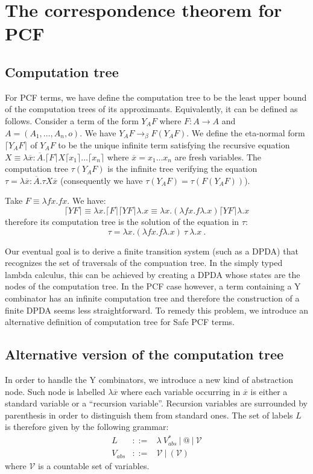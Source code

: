 \documentclass{article}
\newcommand{\aux}[1]{\lceil #1\rceil}
\newcommand{\betared}{\rightarrow_\beta}
\newcommand{\syneq}{\equiv}
\begin{document}
\section{The correspondence theorem for PCF}

\subsection{Computation tree}
For PCF terms, we have define the computation tree to be the least upper bound of the computation trees of its approximants. Equivalently, it can be defined as follows. Consider a term of the form $Y_A F$ where $F:A\rightarrow A$ and $A = (A_1,\ldots,A_n,o)$.
We have $Y_A F \betared F (Y_A F)$.
We define the eta-normal form $\aux{Y_A F}$ of $Y_A F$ to be the unique infinite term satisfying the recursive equation $X \syneq \lambda \overline{x}: \overline{A} . \aux{F} X \aux{x_1} \ldots \aux{x_n} $
where $\overline{x} = x_1 \ldots x_n$ are fresh variables.
The computation tree $\tau(Y_A F)$ is the infinite tree verifying the equation 
$\tau =  \lambda \overline{x}: \overline{A} . \tau X \overline{x}$ (consequently we have $\tau(Y_A F) = \tau(F (Y_A F))$).

Take $F \syneq \lambda f x. f x$. We have:
$$\aux{Y F} \syneq \lambda x . \aux{F} \aux{Y F} \lambda.x \syneq \lambda x. (\lambda f x. f \lambda.x ) \aux{Y F} \lambda.x$$ therefore its computation tree is the solution of the equation in $\tau$: $$\tau = \lambda x . (\lambda f x. f \lambda.x) \ \tau \ \lambda.x \ .$$


Our eventual goal is to derive a finite transition system (such as a DPDA) that recognizes the set of traversals of the compuation tree. In the simply typed lambda calculus, this can be achieved by creating a DPDA whose states are the nodes of the computation tree.
In the PCF case however, a term containing a Y combinator has an infinite computation tree and therefore the construction of a finite DPDA seems less straightforward.
To remedy this problem, we introduce an alternative definition of computation tree for Safe PCF terms.

\subsection{Alternative version of the computation tree}

In order to handle the Y combinators, we introduce a new kind of abstraction node. Such node is labelled $\lambda \overline{x}$ where each variable occurring in $\overline{x}$ is either a standard variable or a ``recursion variable''.
Recursion variables are surrounded by parenthesis in order to distinguish them from standard ones. The set of labels $L$ is therefore given by the following grammar:
\begin{eqnarray*}
L &::=& \lambda\ V_{abs}^*\ |\ @\ |\ \mathcal{V} \\
V_{abs} &::=& \mathcal{V}\ |\ (\mathcal{V})
\end{eqnarray*}
where $\mathcal{V}$ is a countable set of variables.
\end{document}
